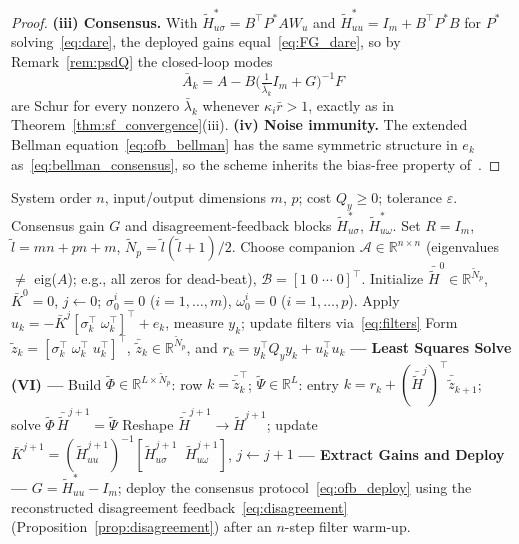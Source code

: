 \documentclass[12pt]{elsarticle}
\theoremstyle{remark}
\newcommand{\R}{\mathbb{R}}
\begin{document}
\begin{proof}
\textbf{(iii) Consensus.} With $\tilde{H}_{u\sigma}^* = B^\top P^* A W_u$ and $\tilde{H}_{uu}^* = I_m + B^\top P^* B$ for $P^*$ solving~\eqref{eq:dare}, the deployed gains equal~\eqref{eq:FG_dare}, so by Remark~\ref{rem:psdQ} the closed-loop modes
\begin{equation*}
\bar{A}_k = A - B\big(\tfrac{1}{\bar{\lambda}_k} I_m + G\big)^{-1}F
\end{equation*}
are Schur for every nonzero $\bar{\lambda}_k$ whenever $\kappa_i \bar{r} > 1$, exactly as in Theorem~\ref{thm:sf_convergence}(iii).
\textbf{(iv) Noise immunity.} The extended Bellman equation~\eqref{eq:ofb_bellman} has the same symmetric structure in $e_k$ as~\eqref{eq:bellman_consensus}, so the scheme inherits the bias-free property of~\cite[Thm.~2.8]{rizvi2022}.
\end{proof}
\begin{algorithm}[!htbp]
\caption{Output Feedback Q-Learning for Consensus Gains}
\label{alg:ofb_ql}
\begin{algorithmic}[1]
\REQUIRE System order $n$, input/output dimensions $m$, $p$; cost $Q_y \geq 0$; tolerance $\varepsilon$.
\ENSURE Consensus gain $G$ and disagreement-feedback blocks $\tilde{H}_{u\sigma}^*$, $\tilde{H}_{u\omega}^*$.
\STATE Set $R = I_m$, $\tilde{l} = mn + pn + m$, $\tilde{N}_p = \tilde{l}(\tilde{l}+1)/2$.
\STATE Choose companion $\mathcal{A} \in \R^{n \times n}$ (eigenvalues $\neq$ eig($A$); e.g., all zeros for dead-beat), $\mathcal{B} = [1 \; 0 \; \cdots \; 0]^\top$.
\STATE Initialize $\bar{\tilde{H}}^0 \in \R^{\tilde{N}_p}$, $\bar{K}^0 = 0$, $j \leftarrow 0$; $\sigma_0^i = 0$ ($i=1,\ldots,m$), $\omega_0^i = 0$ ($i=1,\ldots,p$).
    \STATE Apply $u_k = -\bar{K}^j [\sigma_k^\top \; \omega_k^\top]^\top + e_k$, measure $y_k$; update filters via~\eqref{eq:filters}
    \STATE Form $\tilde{z}_k = [\sigma_k^\top \; \omega_k^\top \; u_k^\top]^\top$, $\bar{\tilde{z}}_k \in \R^{\tilde{N}_p}$, and $r_k = y_k^\top Q_y y_k + u_k^\top u_k$
\ENDFOR
\REPEAT
    \STATE \textbf{--- Least Squares Solve (VI) ---}
    \STATE Build $\tilde{\Phi} \in \R^{L \times \tilde{N}_p}$: row $k = \bar{\tilde{z}}_k^\top$; \; $\tilde{\Psi} \in \R^L$: entry $k = r_k + (\bar{\tilde{H}}^j)^\top \bar{\tilde{z}}_{k+1}$; \; solve $\tilde{\Phi} \, \bar{\tilde{H}}^{j+1} = \tilde{\Psi}$
    \STATE Reshape $\bar{\tilde{H}}^{j+1} \to \tilde{H}^{j+1}$; update $\bar{K}^{j+1} = (\tilde{H}_{uu}^{j+1})^{-1} [\tilde{H}_{u\sigma}^{j+1} \;\; \tilde{H}_{u\omega}^{j+1}]$, \; $j \leftarrow j + 1$
\STATE \textbf{--- Extract Gains and Deploy ---}
\STATE $G = \tilde{H}_{uu}^* - I_m$; deploy the consensus protocol~\eqref{eq:ofb_deploy} using the reconstructed disagreement feedback~\eqref{eq:disagreement} (Proposition~\ref{prop:disagreement}) after an $n$-step filter warm-up.
\end{algorithmic}
\end{algorithm}
\end{document}
